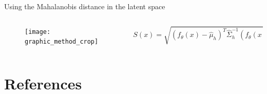 \documentclass[xcolor=pdftex,dvipsnames,table,mathserif]{beamer}
\begin{document}
\begin{frame}{Using the Mahalanobis distance in the latent space}

\begin{columns}
  \begin{column}{.5\textwidth}
  \begin{figure}[ht]
    \centering
    \texttt{[image: graphic\_method\_crop]}
  \end{figure}

  \end{column}

  \begin{column}{.5\textwidth}
    \tiny
    \[S(x) = \sqrt{(f_{\theta}(x)-\hat{\mu}_h)^{T}\hat{\Sigma}^{-1}_{h} (f_{\theta}(x)-\hat{\mu}_h)}\]
  \end{column}
\end{columns}


\end{frame}


\section*{References}


\end{document}
